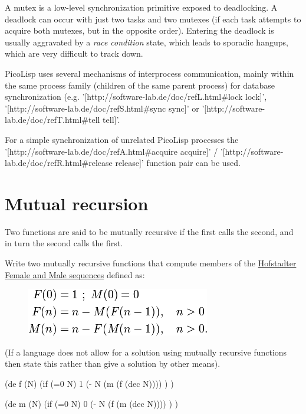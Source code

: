 A mutex is a low-level synchronization primitive exposed to deadlocking.
A deadlock can occur with just two tasks and two mutexes (if each task
attempts to acquire both mutexes, but in the opposite order). Entering
the deadlock is usually aggravated by a
\emph{race condition} state, which leads to
sporadic hangups, which are very difficult to track down.


\begin{wideverbatim}

PicoLisp uses several mechanisms of interprocess communication, mainly within
the same process family (children of the same parent process) for database
synchronization (e.g.
'[http://software-lab.de/doc/refL.html#lock lock]',
'[http://software-lab.de/doc/refS.html#sync sync]' or
'[http://software-lab.de/doc/refT.html#tell tell]'.

For a simple synchronization of unrelated PicoLisp processes the
'[http://software-lab.de/doc/refA.html#acquire acquire]' /
'[http://software-lab.de/doc/refR.html#release release]' function pair
can be used.

\end{wideverbatim}

\pagebreak{}
\section*{Mutual recursion}

Two functions are said to be mutually recursive if the first calls the
second, and in turn the second calls the first.

Write two mutually recursive functions that compute members of the
\href{http://en.wikipedia.org/wiki/Hofstadter\_sequence\#Hofstadter\_Female\_and\_Male\_sequences}{Hofstadter
  Female and Male sequences} defined as:

\begin{figure}[H]
\centering
\includegraphics[scale=.6]{graphics/af460b7986d4afc5fe920b86f15f522a.png}
\end{figure}

(If a language does not allow for a solution using mutually recursive
functions then state this rather than give a solution by other means).


\begin{wideverbatim}

(de f (N)
   (if (=0 N)
      1
      (- N (m (f (dec N)))) ) )

(de m (N)
   (if (=0 N)
      0
      (- N (f (m (dec N)))) ) )

\end{wideverbatim}



% 
